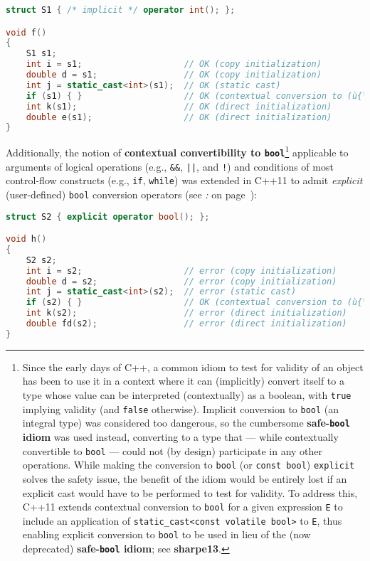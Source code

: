 \begin{lstlisting}[language=C++]
struct S1 { /* implicit */ operator int(); };

void f()
{
    S1 s1;
    int i = s1;                    // OK (copy initialization)
    double d = s1;                 // OK (copy initialization)
    int j = static_cast<int>(s1);  // OK (static cast)
    if (s1) { }                    // OK (contextual conversion to (ù{\codeincomments{bool}}ù))
    int k(s1);                     // OK (direct initialization)
    double e(s1);                  // OK (direct initialization)
}
\end{lstlisting}
    
\noindent Additionally, the notion of \textbf{contextual convertibility to
\texttt{bool}}{\cprotect\footnote{Since the early days of C++, a common
  idiom to test for validity of an object has been to use it in a
  context where it can (implicitly) convert itself to a type whose value
  can be interpreted (contextually) as a boolean, with \texttt{true}
  implying validity (and \texttt{false} otherwise). Implicit conversion
  to \texttt{bool} (an integral type) was considered too dangerous, 
  so the cumbersome \textbf{safe-\texttt{bool} idiom} was used instead,
  converting to a type that --- while contextually convertible to
  \texttt{bool} --- could not (by design) participate in any other
  operations. While making the conversion to \texttt{bool} (or
  \texttt{const}~\texttt{bool}) \texttt{explicit} solves the safety
  issue, the benefit of the idiom would be entirely lost if an explicit
  cast would have to be performed to test for validity. To address this,
  C++11 extends contextual conversion to \texttt{bool} for a given
  expression \texttt{E} to include an application of
  \texttt{static\_cast<const}~\texttt{volatile}~\texttt{bool>} to
  \texttt{E}, thus enabling explicit conversion to \texttt{bool} to be
  used in lieu of the (now deprecated) \textbf{safe-\texttt{bool} idiom}; see
  \textbf{{sharpe13}}.}} applicable to arguments of logical operations
(e.g., \texttt{\&\&}, \texttt{||}, and \texttt{!}) and conditions of
most control-flow constructs (e.g., \texttt{if}, \texttt{while}) was
extended in C++11 to admit \emph{explicit} (user-defined) \texttt{bool}
conversion operators (see {\it{}: } on page~\pageref{enabling-contextual-conversions-to-bool-as-a-test-for-validity}):

\begin{lstlisting}[language=C++]
struct S2 { explicit operator bool(); };

void h()
{
    S2 s2;
    int i = s2;                    // error (copy initialization)
    double d = s2;                 // error (copy initialization)
    int j = static_cast<int>(s2);  // error (static cast)
    if (s2) { }                    // OK (contextual conversion to (ù{\codeincomments{bool}}ù))
    int k(s2);                     // error (direct initialization)
    double fd(s2);                 // error (direct initialization)
}
\end{lstlisting}
    
